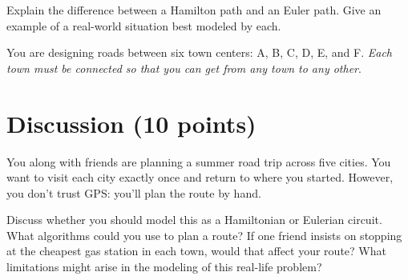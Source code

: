 \documentclass[12pt]{exam}
\begin{document}
\begin{questions}
\begin{parts}
\vspace{4cm}
\end{parts}
\newpage
\question[6] Explain the difference between a Hamilton path and an Euler path. Give an example of a real-world situation best modeled by each.

\vspace{8cm}

\question[6] You are designing roads between six town centers: A, B, C, D, E, and F. \emph{Each town must be connected so that you can get from any town to any other}.

\newpage
\section*{Discussion (10 points)}

\question[10] You along with friends are planning a summer road trip across five cities. You want to visit each city exactly once and return to where you started. However, you don't trust GPS: you'll plan the route by hand. 

Discuss whether you should model this as a Hamiltonian or Eulerian circuit. What algorithms could you use to plan a route? If one friend insists on stopping at the cheapest gas station in each town, would that affect your route? What limitations might arise in the modeling of this real-life problem?

\vspace{8cm}

\end{questions}
\end{document}
